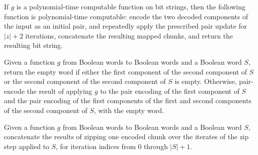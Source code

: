 \begin{theorem}
\label{Complexity.BinArith.polyTimeComputable_mapW}
\leanok
{}
If $g$ is a polynomial-time computable function on bit strings, then the following
function is polynomial-time computable: encode the two decoded components of the input
as an initial pair, and repeatedly apply the prescribed pair update for $|z|+2$
iterations, concatenate the resulting mapped chunks, and return the resulting bit
string.
\end{theorem}

\begin{definition}
\label{Complexity.BinArith.zipChunk}
\leanok
{}
Given a function $g$ from Boolean words to Boolean words and a Boolean word $S$, return
the empty word if either the first component of the second component of $S$ or the
second component of the second component of $S$ is empty. Otherwise, pair-encode the
result of applying $g$ to the pair encoding of the first component of $S$ and the pair
encoding of the first components of the first and second components of the second
component of $S$, with the empty word.
\end{definition}

\begin{definition}
\label{Complexity.BinArith.zipWithW}
\leanok
{}
Given a function $g$ from Boolean words to Boolean words and a Boolean word $S$,
concatenate the results of zipping one encoded chunk over the iterates of the zip step
applied to $S$, for iteration indices from $0$ through $|S|+1$.
\end{definition}

